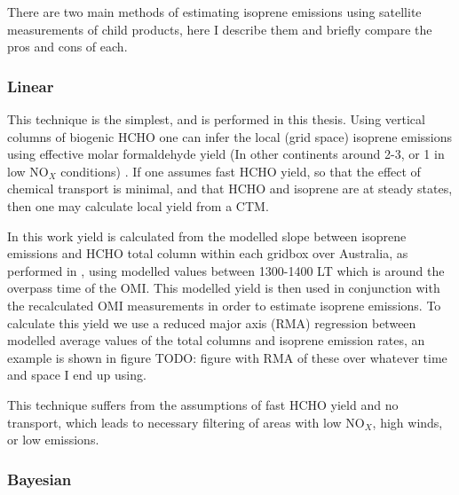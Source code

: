     There are two main methods of estimating isoprene emissions using satellite measurements of child products, here I describe them and briefly compare the pros and cons of each.
    
    \subsubsection{Linear}
      \label{BioIsop:intro:top_down_linear}
      
      This technique is the simplest, and is performed in this thesis.
      Using vertical columns of biogenic HCHO one can infer the local (grid space) isoprene emissions using effective molar formaldehyde yield (In other continents around 2-3, or 1 in low NO$_X$ conditions) \parencite{Palmer2003,Marais2012,Bauwens2016}.
      If one assumes fast HCHO yield, so that the effect of chemical transport is minimal, and that HCHO and isoprene are at steady states, then one may calculate local yield from a CTM.
      
      In this work yield is calculated from the modelled slope between isoprene emissions and HCHO total column within each gridbox over Australia, as performed in \textcite{Palmer2003}, using modelled values between 1300-1400 LT which is around the overpass time of the OMI.
      This modelled yield is then used in conjunction with the recalculated OMI measurements in order to estimate isoprene emissions.
      To calculate this yield we use a reduced major axis (RMA) regression between modelled average values of the total columns and isoprene emission rates, an example is shown in figure TODO: figure with RMA of these over whatever time and space I end up using.
      
      This technique suffers from the assumptions of fast HCHO yield and no transport, which leads to necessary filtering of areas with low NO$_X$, high winds, or low emissions. 
      
    
    \subsubsection{Bayesian}
      
